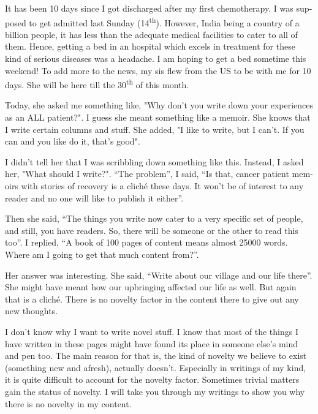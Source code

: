 \vskip 2pt
\begin{english}
\date{Friday November 19 2010}

It has been 10 days since I got discharged after my first chemotherapy. I was supposed to get admitted last Sunday (14\textsuperscript{th}). However, India being a country of a billion people, it has less than the adequate medical facilities to cater to all of them. Hence, getting a bed in an hospital which excels in treatment for these kind of serious diseases was a headache. I am hoping to get a bed sometime this weekend! To add more to the news, my sis flew from the US to be with me for 10 days. She will be here till the 30\textsuperscript{th} of this month. 

Today, she asked me something like, "Why don't you write down your experiences as an ALL patient?". I guess she meant something like a memoir. She knows that I write certain columns and stuff. She added, "I like to write, but I can't. If you can and you like do it, that's good".

I didn't tell her that I was scribbling down something like this. Instead, I asked her, "What should I write?". ``The problem'', I said, ``Is that, cancer patient memoirs with stories of recovery is a cliché these days. It won't be of interest to any reader and no one will like to publish it either''.

Then she said, ``The things you write now cater to a very specific set of people, and still, you have readers. So, there will be someone or the other to read this too''. I replied, ``A book of 100 pages of content means almost 25000 words. Where am I going to get that much content from?''. 

Her answer was interesting. She said, ``Write about our village and our life there''. She might have meant how our upbringing affected our life as well. But again that is a cliché. There is no novelty factor in the content there to give out any new thoughts.

I don't know why I want to write novel stuff. I know that most of the things I have written in these pages might have found its place in someone else's mind and pen too. The main reason for that is, the kind of novelty we believe to exist (something new and afresh), actually doesn't. Especially in writings of my kind, it is quite difficult to account for the novelty factor. Sometimes trivial matters gain the status of novelty. I will take you through my writings to show you why there is no novelty in my content. 


\end{english}
